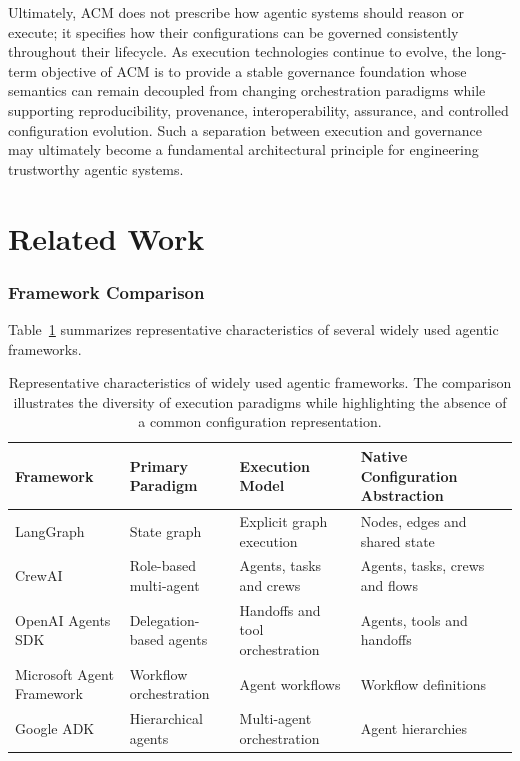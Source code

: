 \documentclass[10pt]{article}
\begin{document}
Ultimately, ACM does not prescribe how agentic systems should reason or execute; it specifies how their configurations can be governed consistently throughout their lifecycle. 
As execution technologies continue to evolve, the long-term objective of ACM is to provide a stable governance foundation whose semantics can remain decoupled from changing orchestration paradigms while supporting reproducibility, provenance, interoperability, assurance, and controlled configuration evolution. Such a separation between execution and governance may ultimately become a fundamental architectural principle for engineering trustworthy agentic systems.

\appendices

\section{Related Work}
\label{appendix:related_work}
\subsubsection{Framework Comparison}
Table~\ref{tab:framework_comparison} summarizes representative characteristics of several widely used agentic frameworks.
\begin{table}[t]
	\centering
	\caption{Representative characteristics of widely used agentic frameworks. The comparison illustrates the diversity of execution paradigms while highlighting the absence of a common configuration representation.}
	\label{tab:framework_comparison}
	
	\renewcommand{\arraystretch}{1.15}
	
	\begin{tabular}{p{3.2cm}p{3.1cm}p{3.4cm}p{3.4cm}c}
		\toprule
		\textbf{Framework}
		&
		\textbf{Primary Paradigm}
		&
		\textbf{Execution Model}
		&
		\textbf{Native Configuration Abstraction}
		\\
		\midrule
		
		LangGraph
		&
		State graph
		&
		Explicit graph execution
		&
		Nodes, edges and shared state
		\\
		
		CrewAI
		&
		Role-based multi-agent
		&
		Agents, tasks and crews
		&
		Agents, tasks, crews and flows
		\\
		
		OpenAI Agents SDK
		&
		Delegation-based agents
		&
		Handoffs and tool orchestration
		&
		Agents, tools and handoffs
		\\
		
		Microsoft Agent Framework
		&
		Workflow orchestration
		&
		Agent workflows
		&
		Workflow definitions
		\\
		
		Google ADK
		&
		Hierarchical agents
		&
		Multi-agent orchestration
		&
		Agent hierarchies
		\\
		
		\bottomrule
	\end{tabular}
	
\end{table}
\end{document}

